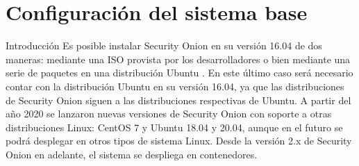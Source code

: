 \chapter{\Large Configuración del sistema base}
\begin{section}{Introducción}
        Es posible instalar Security Onion en su versión 16.04 de dos maneras: mediante una ISO provista por los desarrolladores o bien mediante una serie de paquetes en una distribución Ubuntu \cite{ubuntu}. En este último caso será necesario contar con la distribución Ubuntu en su versión 16.04, ya que las distribuciones de Security Onion siguen a las distribuciones respectivas de Ubuntu. A partir del año 2020 se lanzaron nuevas versiones de Security Onion con soporte a otras distribuciones Linux: CentOS 7 y Ubuntu 18.04 y 20.04, aunque en el futuro se podrá desplegar en otros tipos de sistema Linux. Desde la versión 2.x de Security Onion en adelante, el sistema se despliega en contenedores.
        \end{section}
